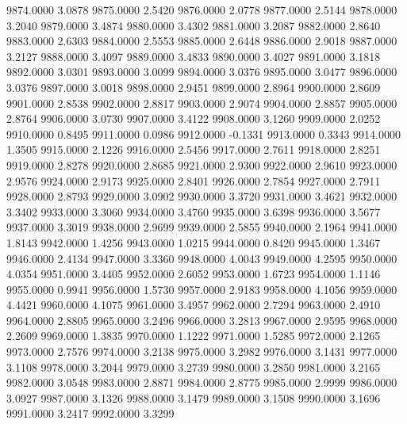 9874.0000      3.0878
9875.0000      2.5420
9876.0000      2.0778
9877.0000      2.5144
9878.0000      3.2040
9879.0000      3.4874
9880.0000      3.4302
9881.0000      3.2087
9882.0000      2.8640
9883.0000      2.6303
9884.0000      2.5553
9885.0000      2.6448
9886.0000      2.9018
9887.0000      3.2127
9888.0000      3.4097
9889.0000      3.4833
9890.0000      3.4027
9891.0000      3.1818
9892.0000      3.0301
9893.0000      3.0099
9894.0000      3.0376
9895.0000      3.0477
9896.0000      3.0376
9897.0000      3.0018
9898.0000      2.9451
9899.0000      2.8964
9900.0000      2.8609
9901.0000      2.8538
9902.0000      2.8817
9903.0000      2.9074
9904.0000      2.8857
9905.0000      2.8764
9906.0000      3.0730
9907.0000      3.4122
9908.0000      3.1260
9909.0000      2.0252
9910.0000      0.8495
9911.0000      0.0986
9912.0000     -0.1331
9913.0000      0.3343
9914.0000      1.3505
9915.0000      2.1226
9916.0000      2.5456
9917.0000      2.7611
9918.0000      2.8251
9919.0000      2.8278
9920.0000      2.8685
9921.0000      2.9300
9922.0000      2.9610
9923.0000      2.9576
9924.0000      2.9173
9925.0000      2.8401
9926.0000      2.7854
9927.0000      2.7911
9928.0000      2.8793
9929.0000      3.0902
9930.0000      3.3720
9931.0000      3.4621
9932.0000      3.3402
9933.0000      3.3060
9934.0000      3.4760
9935.0000      3.6398
9936.0000      3.5677
9937.0000      3.3019
9938.0000      2.9699
9939.0000      2.5855
9940.0000      2.1964
9941.0000      1.8143
9942.0000      1.4256
9943.0000      1.0215
9944.0000      0.8420
9945.0000      1.3467
9946.0000      2.4134
9947.0000      3.3360
9948.0000      4.0043
9949.0000      4.2595
9950.0000      4.0354
9951.0000      3.4405
9952.0000      2.6052
9953.0000      1.6723
9954.0000      1.1146
9955.0000      0.9941
9956.0000      1.5730
9957.0000      2.9183
9958.0000      4.1056
9959.0000      4.4421
9960.0000      4.1075
9961.0000      3.4957
9962.0000      2.7294
9963.0000      2.4910
9964.0000      2.8805
9965.0000      3.2496
9966.0000      3.2813
9967.0000      2.9595
9968.0000      2.2609
9969.0000      1.3835
9970.0000      1.1222
9971.0000      1.5285
9972.0000      2.1265
9973.0000      2.7576
9974.0000      3.2138
9975.0000      3.2982
9976.0000      3.1431
9977.0000      3.1108
9978.0000      3.2044
9979.0000      3.2739
9980.0000      3.2850
9981.0000      3.2165
9982.0000      3.0548
9983.0000      2.8871
9984.0000      2.8775
9985.0000      2.9999
9986.0000      3.0927
9987.0000      3.1326
9988.0000      3.1479
9989.0000      3.1508
9990.0000      3.1696
9991.0000      3.2417
9992.0000      3.3299
